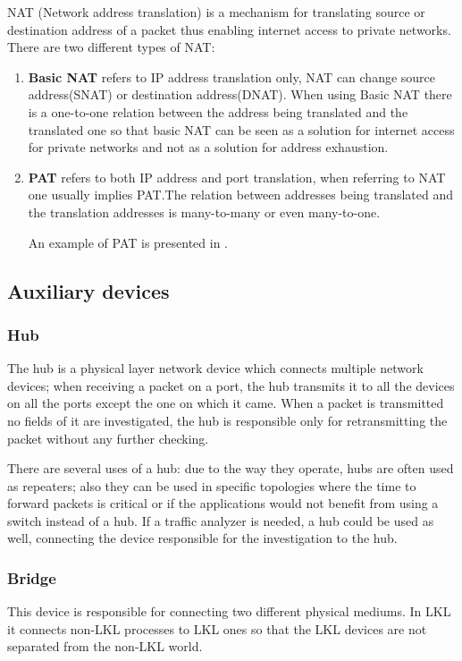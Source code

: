 NAT (Network address translation) is a mechanism for translating source or destination address of a packet thus enabling internet access to private networks. There are two different types of NAT:
\begin{enumerate}
\item \textbf{Basic NAT} refers to IP address translation only, NAT can change source address(SNAT) or destination address(DNAT). When using Basic NAT there is a one-to-one relation between the address being translated and the translated one so that basic NAT can be seen as a solution for internet access for private networks and not as a solution for address exhaustion.
\item \textbf{PAT} refers to both IP address and port translation, when referring to NAT one usually implies PAT.The relation between addresses being translated and the translation addresses is many-to-many or even many-to-one.

An example of PAT is presented in .
\end{enumerate}
\subsection{Auxiliary devices}
\label{sub-sec:auxdev}

\subsubsection{Hub}
The hub is a physical layer network device which connects multiple network devices; when receiving a packet on a port, the hub transmits it to all the devices on all the ports except the one on which it came. When a packet is transmitted no fields of it are investigated, the hub is responsible only for retransmitting the packet without any further checking.

There are several uses of a hub: due to the way they operate, hubs are often used as repeaters; also they can be used in specific topologies where the time to forward packets is critical or if the applications would not benefit from using a switch instead of a hub. If a traffic analyzer is needed, a hub could be used as well, connecting the device responsible for the investigation to the hub.
\subsubsection{Bridge}
This device is responsible for connecting two different physical mediums. In LKL it connects non-LKL processes to LKL ones so that the LKL devices are not separated from the non-LKL world.
